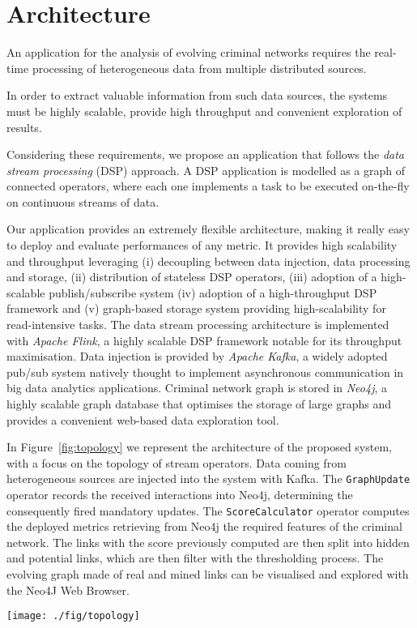 \section{Architecture}
\label{sec:architecture}

An application for the analysis of evolving criminal networks requires the real-time processing of heterogeneous data from multiple distributed sources.

In order to extract valuable information from such data sources, the systems must be highly scalable, provide high throughput and convenient exploration of results.

Considering these requirements, we propose an application that follows the \textit{data stream processing} (DSP) approach. A DSP application is modelled as a graph of connected operators, where each one implements a task to be executed on-the-fly on continuous streams of data.

Our application provides an extremely flexible architecture, making it really easy to deploy and evaluate performances of any metric.
It provides high scalability and throughput leveraging (i) decoupling between data injection, data processing and storage, (ii) distribution of stateless DSP operators, (iii) adoption of a high-scalable publish/subscribe system (iv) adoption of a high-throughput DSP framework and (v) graph-based storage system providing high-scalability for read-intensive tasks.
The data stream processing architecture is implemented with \textit{Apache Flink}, a highly scalable DSP framework notable for its throughput maximisation.
Data injection is provided by \textit{Apache Kafka}, a widely adopted pub/sub system natively thought to implement asynchronous communication in big data analytics applications.
Criminal network graph is stored in \textit{Neo4j}, a highly scalable graph database that optimises the storage of large graphs and provides a convenient web-based data exploration tool.

In Figure~\ref{fig:topology} we represent the architecture of the proposed system, with a focus on the topology of stream operators. Data coming from heterogeneous sources are injected into the system with Kafka. The \texttt{GraphUpdate} operator records the received interactions into Neo4j, determining the consequently fired mandatory updates. The \texttt{ScoreCalculator} operator computes the deployed metrics retrieving from Neo4j the required features of the criminal network. The links with the score previously computed are then split into hidden and potential links, which are then filter with the thresholding process. The evolving graph made of real and mined links can be visualised and explored with the Neo4J Web Browser.

\begin{figure*}
\centering
\texttt{[image: ./fig/topology]}
\caption{The architecture.}
\label{fig:topology}
\end{figure*}


